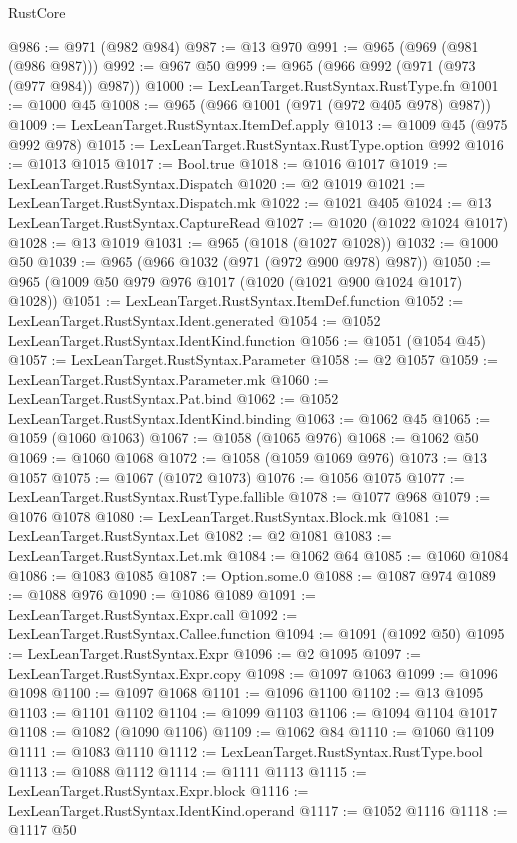 \begin{lexlean}{RustCore}
\begin{coremodule}
@986 := @971 (@982 @984)
@987 := @13 @970
@991 := @965 (@969 (@981 (@986 @987)))
@992 := @967 @50
@999 := @965 (@966 @992 (@971 (@973 (@977 @984)) @987))
@1000 := LexLeanTarget.RustSyntax.RustType.fn
@1001 := @1000 @45
@1008 := @965 (@966 @1001 (@971 (@972 @405 @978) @987))
@1009 := LexLeanTarget.RustSyntax.ItemDef.apply
@1013 := @1009 @45 (@975 @992 @978)
@1015 := LexLeanTarget.RustSyntax.RustType.option @992
@1016 := @1013 @1015
@1017 := Bool.true
@1018 := @1016 @1017
@1019 := LexLeanTarget.RustSyntax.Dispatch
@1020 := @2 @1019
@1021 := LexLeanTarget.RustSyntax.Dispatch.mk
@1022 := @1021 @405
@1024 := @13 LexLeanTarget.RustSyntax.CaptureRead
@1027 := @1020 (@1022 @1024 @1017)
@1028 := @13 @1019
@1031 := @965 (@1018 (@1027 @1028))
@1032 := @1000 @50
@1039 := @965 (@966 @1032 (@971 (@972 @900 @978) @987))
@1050 := @965 (@1009 @50 @979 @976 @1017 (@1020 (@1021 @900 @1024 @1017) @1028))
@1051 := LexLeanTarget.RustSyntax.ItemDef.function
@1052 := LexLeanTarget.RustSyntax.Ident.generated
@1054 := @1052 LexLeanTarget.RustSyntax.IdentKind.function
@1056 := @1051 (@1054 @45)
@1057 := LexLeanTarget.RustSyntax.Parameter
@1058 := @2 @1057
@1059 := LexLeanTarget.RustSyntax.Parameter.mk
@1060 := LexLeanTarget.RustSyntax.Pat.bind
@1062 := @1052 LexLeanTarget.RustSyntax.IdentKind.binding
@1063 := @1062 @45
@1065 := @1059 (@1060 @1063)
@1067 := @1058 (@1065 @976)
@1068 := @1062 @50
@1069 := @1060 @1068
@1072 := @1058 (@1059 @1069 @976)
@1073 := @13 @1057
@1075 := @1067 (@1072 @1073)
@1076 := @1056 @1075
@1077 := LexLeanTarget.RustSyntax.RustType.fallible
@1078 := @1077 @968
@1079 := @1076 @1078
@1080 := LexLeanTarget.RustSyntax.Block.mk
@1081 := LexLeanTarget.RustSyntax.Let
@1082 := @2 @1081
@1083 := LexLeanTarget.RustSyntax.Let.mk
@1084 := @1062 @64
@1085 := @1060 @1084
@1086 := @1083 @1085
@1087 := Option.some.{0}
@1088 := @1087 @974
@1089 := @1088 @976
@1090 := @1086 @1089
@1091 := LexLeanTarget.RustSyntax.Expr.call
@1092 := LexLeanTarget.RustSyntax.Callee.function
@1094 := @1091 (@1092 @50)
@1095 := LexLeanTarget.RustSyntax.Expr
@1096 := @2 @1095
@1097 := LexLeanTarget.RustSyntax.Expr.copy
@1098 := @1097 @1063
@1099 := @1096 @1098
@1100 := @1097 @1068
@1101 := @1096 @1100
@1102 := @13 @1095
@1103 := @1101 @1102
@1104 := @1099 @1103
@1106 := @1094 @1104 @1017
@1108 := @1082 (@1090 @1106)
@1109 := @1062 @84
@1110 := @1060 @1109
@1111 := @1083 @1110
@1112 := LexLeanTarget.RustSyntax.RustType.bool
@1113 := @1088 @1112
@1114 := @1111 @1113
@1115 := LexLeanTarget.RustSyntax.Expr.block
@1116 := LexLeanTarget.RustSyntax.IdentKind.operand
@1117 := @1052 @1116
@1118 := @1117 @50

\end{coremodule}
\end{lexlean}
